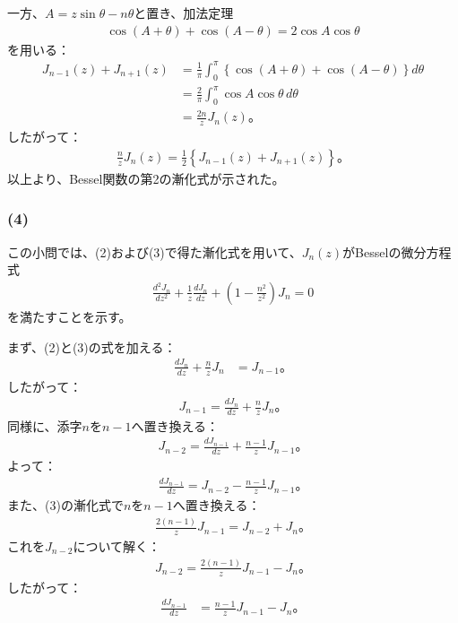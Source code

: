 \documentclass[platex,dvipdfmx,a4paper]{jsarticle}
\newcommand{\bbn}[2]{\frac{d #1}{d #2}}
\newcommand{\nbbn}[3]{\frac{d^{#1} #2}{d #3^{#1}}}
\begin{document}
  一方、$A=z\sin\theta-n\theta$と置き、加法定理
  \begin{align*}
    \cos(A+\theta)+\cos(A-\theta)=2\cos A\cos\theta
  \end{align*}
  を用いる：
  \begin{align*}
    J_{n-1}(z)+J_{n+1}(z)
    &=\frac{1}{\pi}\int_0^\pi
    \left\{\cos(A+\theta)+\cos(A-\theta)\right\}d\theta\\
    &=\frac{2}{\pi}\int_0^\pi
    \cos A\cos\theta\,d\theta\\
    &=\frac{2n}{z}J_n(z)。
  \end{align*}
  したがって：
  \begin{align*}
    \frac{n}{z}J_n(z)
    =\frac{1}{2}\left\{J_{n-1}(z)+J_{n+1}(z)\right\}。
  \end{align*}
  以上より、Bessel関数の第2の漸化式が示された。

  \subsubsection*{(4)}

  この小問では、(2)および(3)で得た漸化式を用いて、$J_n(z)$がBesselの微分方程式
  \begin{align*}
    \nbbn{2}{J_n}{z}
    +\frac{1}{z}\bbn{J_n}{z}
    +\left(1-\frac{n^2}{z^2}\right)J_n
    =0
  \end{align*}
  を満たすことを示す。

  まず、(2)と(3)の式を加える：
  \begin{align*}
    \bbn{J_n}{z}+\frac{n}{z}J_n
    &=J_{n-1}。
  \end{align*}
  したがって：
  \begin{align*}
    J_{n-1}
    =\bbn{J_n}{z}+\frac{n}{z}J_n。
  \end{align*}
  同様に、添字$n$を$n-1$へ置き換える：
  \begin{align*}
    J_{n-2}
    =\bbn{J_{n-1}}{z}+\frac{n-1}{z}J_{n-1}。
  \end{align*}
  よって：
  \begin{align*}
    \bbn{J_{n-1}}{z}
    =J_{n-2}-\frac{n-1}{z}J_{n-1}。
  \end{align*}
  また、(3)の漸化式で$n$を$n-1$へ置き換える：
  \begin{align*}
    \frac{2(n-1)}{z}J_{n-1}=J_{n-2}+J_n。
  \end{align*}
  これを$J_{n-2}$について解く：
  \begin{align*}
    J_{n-2}
    =\frac{2(n-1)}{z}J_{n-1}-J_n。
  \end{align*}
  したがって：
  \begin{align*}
    \bbn{J_{n-1}}{z}
    &=\frac{n-1}{z}J_{n-1}-J_n。
  \end{align*}
\end{document}
